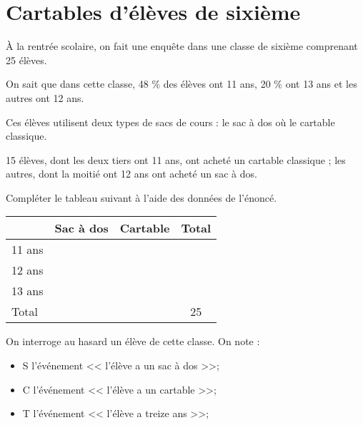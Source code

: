 \section{Cartables d'élèves de sixième}

\`A la rentrée scolaire, on fait une enquête dans une classe de sixième comprenant 25 élèves.

On sait que dans cette classe, 48 \% des élèves ont 11 ans, 20 \% ont 13 ans et les autres ont 12 ans.

Ces élèves utilisent deux types de sacs de cours : le sac à dos où le cartable classique.

15 élèves, dont les deux tiers ont 11 ans, ont acheté un cartable classique ; les autres, dont la moitié ont 12 ans ont acheté un sac à dos.

\begin{questions}
	\question[2] Compléter le tableau suivant à l'aide des données de l'énoncé.
	
	\begin{tabular}{|l|c|c|c|}
		\hline
		 	& Sac à dos & Cartable & Total \\
		 \hline
		 11 ans & & & \\	
		 \hline
		 12 ans & & & \\	
		 \hline
		 13 ans & & & \\	
		 \hline
		 Total & & & 25\\	
		 \hline
	\end{tabular}


	\question On interroge au hasard un élève de cette classe. On note :
	\begin{itemize}
		\item S l'événement << l'élève a un sac à dos >>;
		\item C l'événement << l'élève a un cartable >>;
		\item T l'événement << l'élève a treize ans >>;
	\end{itemize}

\end{questions}